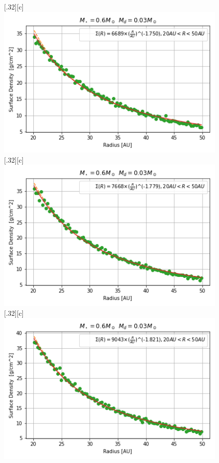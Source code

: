 \documentclass[aps,prb,twocolumn,superscriptaddress,floatfix,longbibliography]{revtex4-2}
\begin{document}
\begin{appendices}
\begin{figure}[!htbp]
  \subcaptionbox*{}[.32\linewidth][c]{%
    \includegraphics[width=\linewidth]{Graphs_1D/r_0.6s_0.03d_0.3q_1D.png}}\quad
  \subcaptionbox*{}[.32\linewidth][c]{%
    \includegraphics[width=\linewidth]{Graphs_1D/r_0.6s_0.03d_0.5q_1D.png}}\quad
  \subcaptionbox*{}[.32\linewidth][c]{%
    \includegraphics[width=\linewidth]{Graphs_1D/r_0.6s_0.03d_0.7q_1D.png}}\quad    

\end{figure}
\end{appendices}
\end{document}
